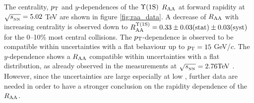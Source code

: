 The centrality, $p_{\rm T}$ and $y$-dependences of the $\mbox{$\Upsilon$(1S)}$ $\mbox{$R_{\rm{AA}}$}$ at forward rapidity at $\sqrt{s_{_{\rm NN}}}=5.02$ \rm{TeV} are shown in figure \ref{fig:raa_data}. 
A decrease of $\mbox{$R_{\rm{AA}}$}$ with increasing centrality is observed down to $R_{\rm{AA}}^{\Upsilon(\rm1S)}=0.33\pm0.03\text{(stat)}\pm0.03\text{(syst)}$  for the 0--10\% most central collisions.
The $p_{\rm T}$-dependence is observed to be compatible within uncertainties with a flat behaviour up to $p_{\rm T}=15$ GeV/$c$.
The $y$-dependence shows a $\mbox{$R_{\rm{AA}}$}$ compatible within uncertainties with a flat distribution, as already observed in the measurements at $\sqrt{s_{_{\rm NN}}}=2.76 \rm{TeV}$ \cite{Abelev:2014nua}.
However, since the uncertainties are large especially at low \pt, further data are needed in order to have a stronger conclusion on the rapidity dependence of the $\mbox{$R_{\rm{AA}}$}$.

